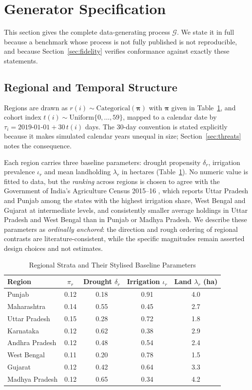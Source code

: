 \documentclass[journal]{IEEEtran}
\newcommand{\dgp}{\ensuremath{\mathcal{G}}}
\begin{document}
\section{Generator Specification}
\label{sec:generator}

This section gives the complete data-generating process $\dgp$. We state it in full because a benchmark whose process is not fully published is not reproducible, and because Section~\ref{sec:fidelity} verifies conformance against exactly these statements.

\subsection{Regional and Temporal Structure}
Regions are drawn as $r(i)\sim\text{Categorical}(\boldsymbol{\pi})$ with $\boldsymbol{\pi}$ given in Table~\ref{tab:regions}, and cohort index $t(i)\sim\text{Uniform}\{0,\dots,59\}$, mapped to a calendar date by $\tau_i = \text{2019-01-01} + 30\,t(i)$ days. The 30-day convention is stated explicitly because it makes simulated calendar years unequal in size; Section~\ref{sec:threats} notes the consequence.

Each region carries three baseline parameters: drought propensity $\delta_r$, irrigation prevalence $\iota_r$ and mean landholding $\lambda_r$ in hectares (Table~\ref{tab:regions}). No numeric value is fitted to data, but the \emph{ranking} across regions is chosen to agree with the Government of India's Agriculture Census 2015--16 \cite{agcensus2016}, which reports Uttar Pradesh and Punjab among the states with the highest irrigation share, West Bengal and Gujarat at intermediate levels, and consistently smaller average holdings in Uttar Pradesh and West Bengal than in Punjab or Madhya Pradesh. We describe these parameters as \emph{ordinally anchored}: the direction and rough ordering of regional contrasts are literature-consistent, while the specific magnitudes remain asserted design choices and not estimates.

\begin{table}[!t]
\caption{Regional Strata and Their Stylised Baseline Parameters}
\label{tab:regions}
\centering
\footnotesize
\begin{tabular}{@{}lcccc@{}}
\toprule
Region & $\pi_r$ & Drought $\delta_r$ & Irrigation $\iota_r$ & Land $\lambda_r$ (ha) \\
\midrule
Punjab      & 0.12 & 0.18 & 0.91 & 4.0 \\
Maharashtra & 0.14 & 0.55 & 0.45 & 2.7 \\
Uttar Pradesh & 0.15 & 0.28 & 0.72 & 1.8 \\
Karnataka   & 0.12 & 0.62 & 0.38 & 2.9 \\
Andhra Pradesh & 0.12 & 0.48 & 0.54 & 2.4 \\
West Bengal & 0.11 & 0.20 & 0.78 & 1.5 \\
Gujarat     & 0.12 & 0.42 & 0.64 & 3.3 \\
Madhya Pradesh & 0.12 & 0.65 & 0.34 & 4.2 \\
\bottomrule
\end{tabular}
\end{table}
\end{document}
